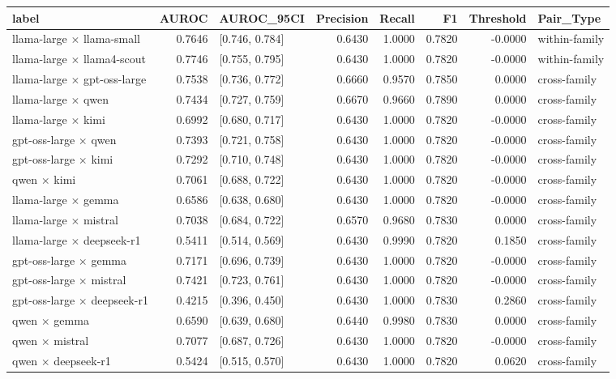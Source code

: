 \begin{tabular}{lrlrrrrl}
\toprule
label & AUROC & AUROC\_95CI & Precision & Recall & F1 & Threshold & Pair\_Type \\
\midrule
llama-large $\times$ llama-small & 0.7646 & [0.746, 0.784] & 0.6430 & 1.0000 & 0.7820 & -0.0000 & within-family \\
llama-large $\times$ llama4-scout & 0.7746 & [0.755, 0.795] & 0.6430 & 1.0000 & 0.7820 & -0.0000 & within-family \\
llama-large $\times$ gpt-oss-large & 0.7538 & [0.736, 0.772] & 0.6660 & 0.9570 & 0.7850 & 0.0000 & cross-family \\
llama-large $\times$ qwen & 0.7434 & [0.727, 0.759] & 0.6670 & 0.9660 & 0.7890 & 0.0000 & cross-family \\
llama-large $\times$ kimi & 0.6992 & [0.680, 0.717] & 0.6430 & 1.0000 & 0.7820 & -0.0000 & cross-family \\
gpt-oss-large $\times$ qwen & 0.7393 & [0.721, 0.758] & 0.6430 & 1.0000 & 0.7820 & -0.0000 & cross-family \\
gpt-oss-large $\times$ kimi & 0.7292 & [0.710, 0.748] & 0.6430 & 1.0000 & 0.7820 & -0.0000 & cross-family \\
qwen $\times$ kimi & 0.7061 & [0.688, 0.722] & 0.6430 & 1.0000 & 0.7820 & -0.0000 & cross-family \\
llama-large $\times$ gemma & 0.6586 & [0.638, 0.680] & 0.6430 & 1.0000 & 0.7820 & -0.0000 & cross-family \\
llama-large $\times$ mistral & 0.7038 & [0.684, 0.722] & 0.6570 & 0.9680 & 0.7830 & 0.0000 & cross-family \\
llama-large $\times$ deepseek-r1 & 0.5411 & [0.514, 0.569] & 0.6430 & 0.9990 & 0.7820 & 0.1850 & cross-family \\
gpt-oss-large $\times$ gemma & 0.7171 & [0.696, 0.739] & 0.6430 & 1.0000 & 0.7820 & -0.0000 & cross-family \\
gpt-oss-large $\times$ mistral & 0.7421 & [0.723, 0.761] & 0.6430 & 1.0000 & 0.7820 & -0.0000 & cross-family \\
gpt-oss-large $\times$ deepseek-r1 & 0.4215 & [0.396, 0.450] & 0.6430 & 1.0000 & 0.7830 & 0.2860 & cross-family \\
qwen $\times$ gemma & 0.6590 & [0.639, 0.680] & 0.6440 & 0.9980 & 0.7830 & 0.0000 & cross-family \\
qwen $\times$ mistral & 0.7077 & [0.687, 0.726] & 0.6430 & 1.0000 & 0.7820 & -0.0000 & cross-family \\
qwen $\times$ deepseek-r1 & 0.5424 & [0.515, 0.570] & 0.6430 & 1.0000 & 0.7820 & 0.0620 & cross-family \\

\end{tabular}
